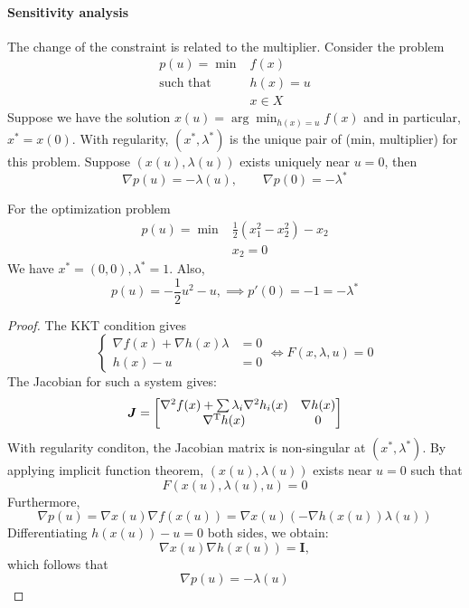\paragraph{Sensitivity analysis}
The change of the constraint is related to the multiplier. Consider the problem
\[
\begin{array}{ll}
p(u)=\min&f(x)\\
\mbox{such that}&h(x)=u\\
&x\in X
\end{array}
\]
Suppose we have the solution $x(u)=\arg\min_{h(x)=u}f(x)$ and in particular, $x^*=x(0)$. With regularity, $(x^*,\lambda^*)$ is the unique pair of (min, multiplier) for this problem. Suppose $(x(u),\lambda(u))$ exists uniquely near $u=0$, then
\[
\nabla p(u) = -\lambda(u),\qquad
\nabla p(0) = -\lambda^*
\]
\begin{example}
For the optimization problem
\[
\begin{array}{ll}
p(u)=\min&\frac{1}{2}(x_1^2-x_2^2) - x_2\\
&x_2=0
\end{array}
\]
We have $x^*=(0,0),\lambda^*=1$. Also, 
\[
p(u)=-\frac{1}{2}u^2-u,\implies
p'(0)=-1=-\lambda^*
\]


\end{example}
\begin{proof}
The KKT condition gives
\[
\left\{
\begin{aligned}
\nabla f(x) + \nabla h(x)\lambda&=0\\
h(x)- u&=0
\end{aligned}
\right.\Longleftrightarrow
F(x,\lambda,u)=0
\]
The Jacobian for such a system gives:
\[
\bm J=\begin{bmatrix}
\nabla^2f(x)+\sum\lambda_i\nabla^2h_i(x)&\nabla h(x)\\
\nabla^{\mathrm T} h(x)&0
\end{bmatrix}
\]
With regularity conditon, the Jacobian matrix is non-singular at $(x^*,\lambda^*)$. By applying implicit function theorem, $(x(u),\lambda(u))$ exists near $u=0$ such that
\[
F(x(u),\lambda(u),u)=0
\]
Furthermore,
\[
\nabla p(u)=\nabla x(u)\nabla f(x(u)) = \nabla x(u)\left(
-\nabla h(x(u))\lambda(u)
\right)
\]
Differentiating $h(x(u)) - u=0$ both sides, we obtain:
\[
\nabla x(u)\nabla h(x(u)) = \bm I,
\]
which follows that
\[
\nabla p(u)= -\lambda(u)
\]

\end{proof}

